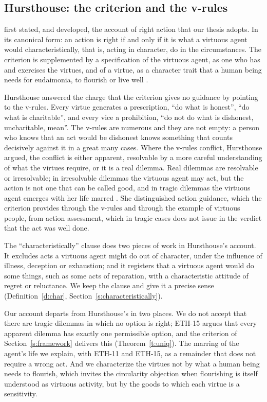 \documentclass{situationist-preprint}
\begin{document}
\subsection{Hursthouse: the criterion and the v-rules}

\citet{Hursthouse1991} first stated, and \citet{Hursthouse1999} developed, the account of right action that our thesis adopts. In its canonical form: an action is right if and only if it is what a virtuous agent would characteristically, that is, acting in character, do in the circumstances. The criterion is supplemented by a specification of the virtuous agent, as one who has and exercises the virtues, and of a virtue, as a character trait that a human being needs for eudaimonia, to flourish or live well \citep[ch.~1]{Hursthouse1999}.

Hursthouse answered the charge that the criterion gives no guidance by pointing to the v-rules. Every virtue generates a prescription, \enquote{do what is honest}, \enquote{do what is charitable}, and every vice a prohibition, \enquote{do not do what is dishonest, uncharitable, mean}. The v-rules are numerous and they are not empty: a person who knows that an act would be dishonest knows something that counts decisively against it in a great many cases. Where the v-rules conflict, Hursthouse argued, the conflict is either apparent, resolvable by a more careful understanding of what the virtues require, or it is a real dilemma. Real dilemmas are resolvable or irresolvable; in irresolvable dilemmas the virtuous agent may act, but the action is not one that can be called good, and in tragic dilemmas the virtuous agent emerges with her life marred \citep[ch.~3]{Hursthouse1999}. She distinguished action guidance, which the criterion provides through the v-rules and through the example of virtuous people, from action assessment, which in tragic cases does not issue in the verdict that the act was well done.

The \enquote{characteristically} clause does two pieces of work in Hursthouse's account. It excludes acts a virtuous agent might do out of character, under the influence of illness, deception or exhaustion; and it registers that a virtuous agent would do some things, such as some acts of reparation, with a characteristic attitude of regret or reluctance. We keep the clause and give it a precise sense (Definition~\ref{d:char}, Section~\ref{s:characteristically}).

Our account departs from Hursthouse's in two places. We do not accept that there are tragic dilemmas in which no option is right; ETH-15 argues that every apparent dilemma has exactly one permissible option, and the criterion of Section~\ref{s:framework} delivers this (Theorem~\ref{t:uniq}). The marring of the agent's life we explain, with ETH-11 and ETH-15, as a remainder that does not require a wrong act. And we characterize the virtues not by what a human being needs to flourish, which invites the circularity objection when flourishing is itself understood as virtuous activity, but by the goods to which each virtue is a sensitivity.
\end{document}
